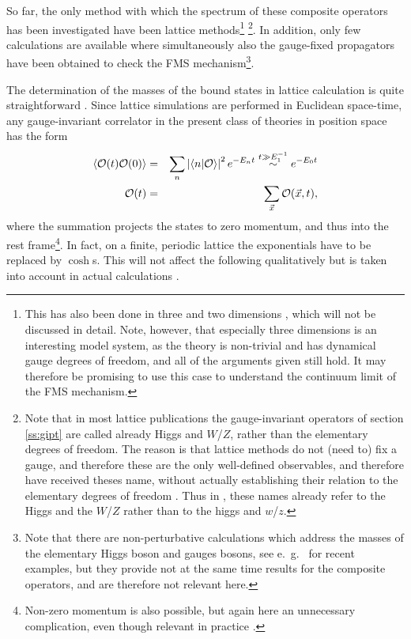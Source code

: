 \documentclass[final,12pt,3p,longtitle]{elsarticle}
\newcommand*{\no}{\noindent}
\newcommand*{\bea}{\begin{eqnarray}}
\newcommand*{\eea}{\end{eqnarray}}
\newcommand*{\nn}{\nonumber}
\newcommand*{\1}{1\!\!\!\bot}
\newcommand*{\la}{\left\langle}
\newcommand*{\ra}{\right\rangle}
\newcommand*{\op}{{\cal O}}
\begin{document}
So far, the only method with which the spectrum of these composite operators has been investigated have been lattice methods\footnote{This has also been done in three \cite{Philipsen:1996af,Capri:2012cr} and two dimensions \cite{Gongyo:2014jfa}, which will not be discussed in detail. Note, however, that especially three dimensions is an interesting model system, as the theory is non-trivial and has dynamical gauge degrees of freedom, and all of the arguments given still hold. It may therefore be promising to use this case to understand the continuum limit of the FMS mechanism.} \cite{Wurtz:2013ova,Maas:2013aia,Maas:2014pba,Maas:2012tj,Evertz:1986vp,Evertz:1985fc,Langguth:1985eu,Langguth:1985dr,Kuti:1987nr}\footnote{Note that in most lattice publications the gauge-invariant operators of section \ref{ss:gipt} are called already Higgs and $W$/$Z$, rather than the elementary degrees of freedom. The reason is that lattice methods do not (need to) fix a gauge, and therefore these are the only well-defined observables, and therefore have received theses name, without actually establishing their relation to the elementary degrees of freedom \cite{Lang:pc}. Thus in \cite{Wurtz:2013ova,Evertz:1986vp,Evertz:1985fc,Langguth:1985eu,Langguth:1985dr,Kuti:1987nr,Philipsen:1996af}, these names already refer to the Higgs and the $W$/$Z$ rather than to the higgs and $w$/$z$.}. In addition, only few calculations are available where simultaneously also the gauge-fixed propagators have been obtained \cite{Maas:2013aia,Maas:2012tj,Maas:2010nc} to check the FMS mechanism\footnote{Note that there are non-perturbative calculations which address the masses of the elementary Higgs boson and gauges bosons, see e.\ g.\ \cite{Benes:2008ir,Fister:2010yw,Capri:2013oja,Gies:2015lia} for recent examples, but they provide not at the same time results for the composite operators, and are therefore not relevant here.}.

The determination of the masses of the bound states in lattice calculation is quite straightforward \cite{Montvay:1994cy,Gattringer:2010zz}. Since lattice simulations are performed in Euclidean space-time, any gauge-invariant correlator in the present class of theories in position space has the form \cite{Seiler:1982pw,Frohlich:1981yi}
\bea
\la\op(t)\op(0)\ra&=&\sum_n\left|\la n|\op\ra\right|^2e^{-E_n t}\stackrel{t\gg E_1^{-1}}{\sim}e^{-E_0 t}\label{lelevels}\\
\op(t)&=&\sum_{\vec x}\op(\vec x,t)\nn,
\eea
\no where the summation projects the states to zero momentum, and thus into the rest frame\footnote{Non-zero momentum is also possible, but again here an unnecessary complication, even though relevant in practice \cite{Gattringer:2010zz,Wurtz:2013ova}.}. In fact, on a finite, periodic lattice the exponentials have to be replaced by $\cosh$s. This will not affect the following qualitatively but is taken into account in actual calculations \cite{Montvay:1994cy,Gattringer:2010zz}.
\end{document}

